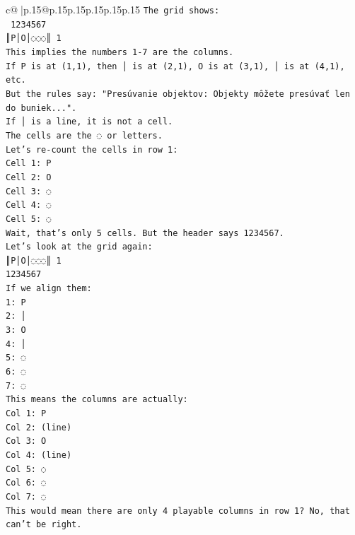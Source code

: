 \documentclass{article}
\begin{document}
{\begin{supertabular}{c@{$\;$}|p{.15\linewidth}@{}p{.15\linewidth}p{.15\linewidth}p{.15\linewidth}p{.15\linewidth}p{.15\linewidth}}
{{{\texttt{The grid shows:} \\
\texttt{ 1234567} \\
\texttt{║P│O│◌◌◌║ 1} \\
\texttt{This implies the numbers 1{-}7 are the columns.} \\
\texttt{If P is at (1,1), then │ is at (2,1), O is at (3,1), │ is at (4,1), etc.} \\
\texttt{But the rules say: "Presúvanie objektov: Objekty môžete presúvať len do buniek...".} \\
\texttt{If │ is a line, it is not a cell.} \\
\texttt{The cells are the ◌ or letters.} \\
\texttt{Let's re{-}count the cells in row 1:} \\
\texttt{Cell 1: P} \\
\texttt{Cell 2: O} \\
\texttt{Cell 3: ◌} \\
\texttt{Cell 4: ◌} \\
\texttt{Cell 5: ◌} \\
\texttt{Wait, that's only 5 cells. But the header says 1234567.} \\
\texttt{Let's look at the grid again:} \\
\texttt{║P│O│◌◌◌║ 1} \\
\texttt{1234567} \\
\texttt{If we align them:} \\
\texttt{1: P} \\
\texttt{2: │} \\
\texttt{3: O} \\
\texttt{4: │} \\
\texttt{5: ◌} \\
\texttt{6: ◌} \\
\texttt{7: ◌} \\
\texttt{This means the columns are actually:} \\
\texttt{Col 1: P} \\
\texttt{Col 2: (line)} \\
\texttt{Col 3: O} \\
\texttt{Col 4: (line)} \\
\texttt{Col 5: ◌} \\
\texttt{Col 6: ◌} \\
\texttt{Col 7: ◌} \\
\texttt{This would mean there are only 4 playable columns in row 1? No, that can't be right.} \\
\\ 
}}}
\end{supertabular}}
\end{document}
